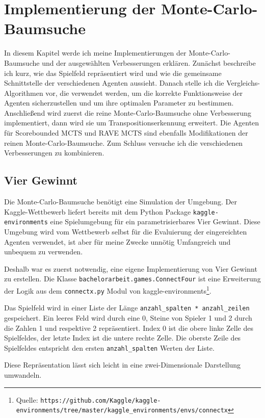\section{Implementierung der Monte-Carlo-Baumsuche}
\label{chap:mcts-impl}

In diesem Kapitel werde ich meine Implementierungen der Monte-Carlo-Baumsuche und der ausgewählten Verbesserungen erklären.
Zunächst beschreibe ich kurz, wie das Spielfeld repräsentiert wird und wie die gemeinsame Schnittstelle der verschiedenen Agenten aussieht.
Danach stelle ich die Vergleichs-Algorithmen vor, die verwendet werden, um die korrekte Funktionsweise der Agenten sicherzustellen und um ihre optimalen Parameter zu bestimmen.
Anschließend wird zuerst die reine Monte-Carlo-Baumsuche ohne Verbesserung implementiert, dann wird sie um Transpositionserkennung erweitert.
Die Agenten für Scorebounded MCTS und RAVE MCTS sind ebenfalls Modifikationen der reinen Monte-Carlo-Baumsuche. Zum Schluss versuche ich die verschiedenen Verbesserungen zu kombinieren.

\subsection{Vier Gewinnt}
\label{chap:viergewinnt-impl}
Die Monte-Carlo-Baumsuche benötigt eine Simulation der Umgebung.
Der Kaggle-Wettbewerb liefert bereits mit dem Python Package \verb|kaggle-environments| eine Spielumgebung für ein parametrisierbares Vier Gewinnt.
Diese Umgebung wird vom Wettbewerb selbst für die Evaluierung der eingereichten Agenten verwendet, ist aber für meine Zwecke unnötig Umfangreich und unbequem zu verwenden.

Deshalb war es zuerst notwendig, eine eigene Implementierung von Vier Gewinnt zu erstellen.
Die Klasse \verb|bachelorarbeit.games.ConnectFour| ist eine Erweiterung der Logik aus dem \verb|connectx.py| Modul von kaggle-environments\footnote{Quelle: \texttt{https://github.com/Kaggle/kaggle-environments/tree/master/kaggle\_environments/envs/connectx}}.

Das Spielfeld wird in einer Liste der Länge \verb|anzahl_spalten * anzahl_zeilen| gespeichert.
Ein leeres Feld wird durch eine 0, Steine von Spieler 1 und 2 durch die Zahlen 1 und respektive 2 repräsentiert.
Index 0 ist  die obere linke Zelle des Spielfeldes, der letzte Index ist die untere rechte Zelle.
Die oberste Zeile des Spielfeldes entspricht den ersten \verb|anzahl_spalten| Werten der Liste.

Diese Repräsentation lässt sich leicht in eine zwei-Dimensionale Darstellung umwandeln.

